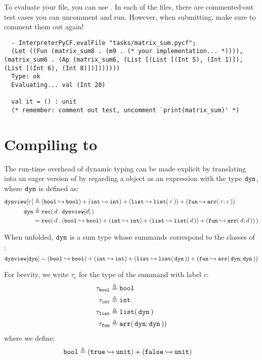 \documentclass[11pt]{article}
\begin{document}
To evaluate your file, you can use .
In each of the files, there are commented-out test cases you can uncomment and run.
However, when submitting, make sure to comment them out again!

\begin{lstlisting}
  - InterpreterPyCF.evalFile "tasks/matrix_sum.pycf";
  (Let ((Fun (matrix_sum8 . (m9 . (* your implementation... *)))), (matrix_sum6 . (Ap (matrix_sum6, (List [(List [(Int 5), (Int 1)]), (List [(Int 6), (Int 8)])]))))))
  Type: ok
  Evaluating... val (Int 20)

  val it = () : unit
  (* remember: comment out test, uncomment `print(matrix_sum)' *)
\end{lstlisting}

\section{Compiling \LangPyCF{} to \LangFPC{}}

The run-time overhead of dynamic typing can be made explicit by translating \LangPyCF{} into an eager
version of \LangFPC{} by regarding a \LangPyCF{} object as an \LangFPC{} expression with the type $\mathtt{dyn}$, where $\mathtt{dyn}$ is defined as:
\begin{align*}
  \mathtt{dynview}[\tau] &\mathrel{\triangleq}
    (\mathtt{bool} \mathbin{\hookrightarrow} \mathtt{bool})
    + (\mathtt{int} \mathbin{\hookrightarrow} \mathtt{int})
    + (\mathtt{list} \mathbin{\hookrightarrow} {\mathtt{list}}\mathtt{(}\,\tau\,\mathtt{)})
    + (\mathtt{fun} \mathbin{\hookrightarrow} {\mathtt{arr}}\mathtt{(}\,\tau;\tau\,\mathtt{)}) \\
  \mathtt{dyn}
    &\mathrel{\triangleq} {\mathtt{rec}}\mathtt{(}\,{d}\mathbin{\mathtt{.}}{\mathtt{dynview}[d]}\,\mathtt{)} \\
    &= {\mathtt{rec}}\mathtt{(}\,{d}\mathbin{\mathtt{.}}{
      (\mathtt{bool} \mathbin{\hookrightarrow} \mathtt{bool})
      + (\mathtt{int} \mathbin{\hookrightarrow} \mathtt{int})
      + (\mathtt{list} \mathbin{\hookrightarrow} {\mathtt{list}}\mathtt{(}\,d\,\mathtt{)})
      + (\mathtt{fun} \mathbin{\hookrightarrow} {\mathtt{arr}}\mathtt{(}\,d;d\,\mathtt{)})
    }\,\mathtt{)}
\end{align*}

When unfolded, $\mathtt{dyn}$ is a sum type whose summands correspond to the classes of \LangPyCF{}:
\[
  \mathtt{dynview}[\mathtt{dyn}]
    =
  (\mathtt{bool} \mathbin{\hookrightarrow} \mathtt{bool})
  + (\mathtt{int} \mathbin{\hookrightarrow} \mathtt{int})
  + (\mathtt{list} \mathbin{\hookrightarrow} {\mathtt{list}}\mathtt{(}\,\mathtt{dyn}\,\mathtt{)})
  + (\mathtt{fun} \mathbin{\hookrightarrow} {\mathtt{arr}}\mathtt{(}\,\mathtt{dyn};\mathtt{dyn}\,\mathtt{)})
\]

For brevity, we write $\tau_c$ for the type of the summand with label $c$:
%
\begin{align*}{}
  \tau_{\mathtt{bool}} &\mathrel{\triangleq}{} \mathtt{bool} \\
  \tau_{\mathtt{int}}  &\mathrel{\triangleq}{} \mathtt{int} \\
  \tau_{\mathtt{list}} &\mathrel{\triangleq}{} {\mathtt{list}}\mathtt{(}\,\mathtt{dyn}\,\mathtt{)} \\
  \tau_{\mathtt{fun}}  &\mathrel{\triangleq}{} {\mathtt{arr}}\mathtt{(}\,\mathtt{dyn};\mathtt{dyn}\,\mathtt{)})
\end{align*}
where we define:
\begin{align*}
  \mathtt{bool} &\mathrel{\triangleq} (\mathtt{true} \mathbin{\hookrightarrow} \mathtt{unit}) + (\mathtt{false} \mathbin{\hookrightarrow} \mathtt{unit})
\end{align*}
\end{document}
